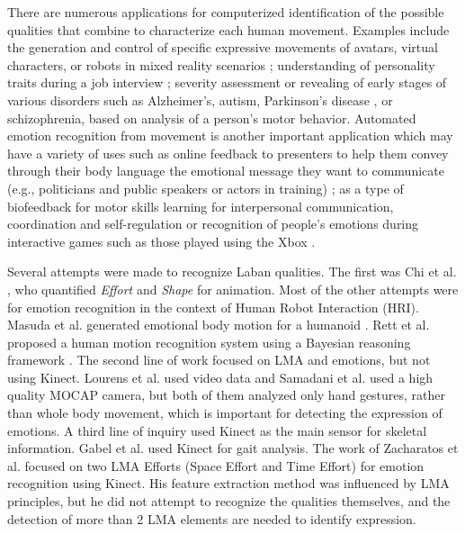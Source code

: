 \documentclass{sigchi}
\begin{document}
\mbox{}
\par
There are numerous applications for computerized identification of
the possible qualities that combine to characterize each human
movement. Examples include the generation and control of specific
expressive movements of avatars, virtual characters, or robots in
mixed reality scenarios \cite{Masuda}; understanding of personality 
traits during a job interview \cite{levy2003use}; 
severity assessment or revealing of early stages of various disorders 
such as Alzheimer's, autism, Parkinson's disease \cite{camurri2003application}, or schizophrenia, based on analysis
of a person's motor behavior. Automated emotion recognition from
movement is another important application which may have a
variety of uses such as online feedback to presenters to
help them convey through their body language
the emotional message they want to
communicate (e.g., politicians and public
speakers or actors in training) \cite{nguyen2012online}; as a type of biofeedback for motor skills learning for interpersonal communication,
coordination and self-regulation or recognition of people's emotions during interactive games such as those
played using the Xbox \cite{Zacharatos}.
\mbox{}\\
\par
Several attempts were made to recognize Laban qualities. The first was Chi
et al. \cite{chi2000emote}, who quantified \textit{Effort} and \textit{Shape} for animation.
Most of the other attempts were for emotion recognition in the context of Human Robot Interaction (HRI).
Masuda et al. generated emotional body motion for a humanoid \cite{Masuda}.
Rett et al. proposed a human motion recognition system using a Bayesian reasoning framework \cite{Rett}.
The second line of work focused on LMA and emotions, but not using Kinect.
Lourens et al. \cite{lourens2010communicating} used video data and Samadani et al.
\cite{samadani2013laban} used a high quality MOCAP camera, but both of them
analyzed only hand gestures, rather than whole body movement, which is important for detecting the expression of emotions. A third line of inquiry used Kinect as the main sensor for skeletal information. Gabel et al. \cite{gabel2012full} used Kinect for gait analysis. 
The work of Zacharatos et al. \cite{Zacharatos} focused on two LMA Efforts (Space Effort and Time Effort) for emotion recognition using Kinect. His feature extraction method was influenced by LMA principles, but he did not attempt to recognize the qualities themselves, and the detection of more than 2 LMA elements are needed to identify expression.
\end{document}
